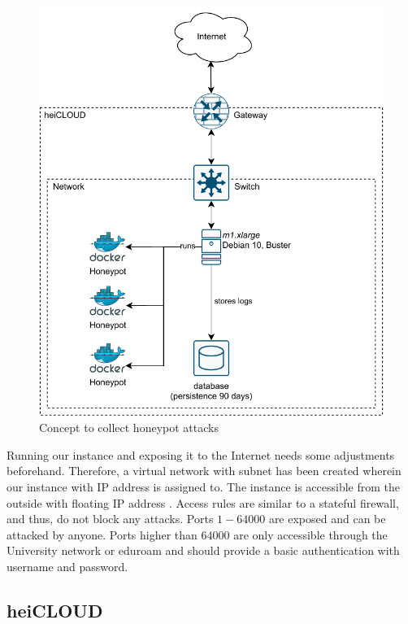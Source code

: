 \begin{figure}[ht]
    \centering
    \includegraphics{figures/tpot-concept.pdf}
    \caption[Draft for data collection]{Concept to collect honeypot attacks}
    \label{fig:concept}
\end{figure}

Running our instance and exposing it to the Internet needs some adjustments beforehand.
Therefore, a virtual network with subnet  has been created wherein our instance with IP address  is assigned to.
The instance is accessible from the outside with floating IP address .
Access rules are similar to a stateful firewall, and thus, do not block any attacks.
Ports $1-64000$ are exposed and can be attacked by anyone.
Ports higher than $64000$ are only accessible through the University network  or eduroam  and should provide a basic authentication with username and password.

\subsection{heiCLOUD}
\label{subsec:heicloud}

